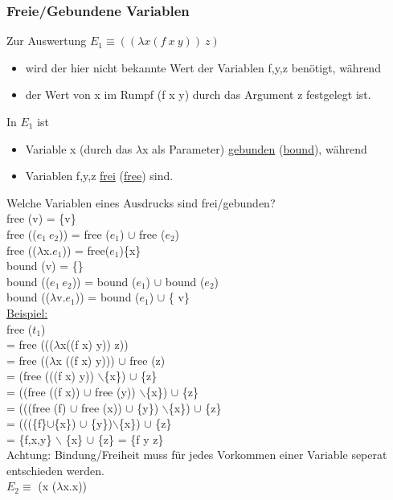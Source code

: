 \documentclass[a4paper,12pt]{article}
\begin{document}
\subsubsection{Freie/Gebundene Variablen}
Zur Auswertung $E_1\equiv((\lambda x(f \ x \ y))\ z)$\\
\begin{itemize}
\item wird der hier nicht bekannte Wert der Variablen f,y,z benötigt, während
\item der Wert von x im Rumpf (f x y) durch das Argument z festgelegt ist.
\end{itemize}
In $E_1$ ist
\begin{itemize}
\item Variable x (durch das $\lambda$x als Parameter) \uline{gebunden} (\uline{bound}), während
\item Variablen f,y,z \uline{frei} (\uline{free}) sind.
\end{itemize}
Welche Variablen eines Ausdrucks sind frei/gebunden?\\
free (v) = \{v\}\\
free (($e_1 \ e_2$)) = free ($e_1$) $\cup$ free ($e_2$)\\
free (($\lambda$x.$e_1$)) = free($e_1$)\text{\ }\{x\}\\
bound (v) = \{\}\\
bound (($e_1 \ e_2$)) = bound ($e_1$) $\cup$ bound ($e_2$)\\
bound (($\lambda$v.$e_1$)) = bound ($e_1$) $\cup$ \{ v\}\\
\uline{Beispiel:}\\
free ($t_1$)\\
= free ((($\lambda$x((f x) y)) z))\\
= free (($\lambda$x ((f x) y))) $\cup$ free (z)\\
= (free (((f x) y)) $\backslash$\{x\}) $\cup$ \{z\}\\
= ((free ((f x)) $\cup$ free (y)) $\backslash$\{x\}) $\cup$ \{z\}\\
= (((free (f) $\cup$ free (x)) $\cup$ \{y\}) $\backslash$\{x\}) $\cup$ \{z\}\\
= (((\{f\}$\cup$\{x\}) $\cup$ \{y\})$\backslash$\{x\}) $\cup$ \{z\}\\
= \{f,x,y\} $\backslash$ \{x\} $\cup$ \{z\} = \{f y z\}\\
Achtung: Bindung/Freiheit muss für jedes Vorkommen einer Variable seperat entschieden werden.\\ $E_2 \equiv$ (x ($\lambda$x.x))\\
\end{document}
